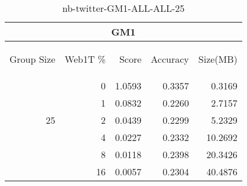 \begin{center}
\begin{table}[htbp]
\begin{tabular}{ | r | r | r | r | r |}
\hline
\multicolumn{5}{|c|}{GM1}\\
\hline
\begin{sideways}Group Size\end{sideways} & \begin{sideways}Web1T \%\end{sideways} & \begin{sideways}Score\end{sideways} & \begin{sideways}Accuracy\end{sideways} & \begin{sideways}Size(MB)\end{sideways}\\
\hline
\multirow{5}{*}{25}
 & 0 & 1.0593 & 0.3357 & 0.3169\\ \cline{2-5}
 & 1 & 0.0832 & 0.2260 & 2.7157\\ \cline{2-5}
 & 2 & 0.0439 & 0.2299 & 5.2329\\ \cline{2-5}
 & 4 & 0.0227 & 0.2332 & 10.2692\\ \cline{2-5}
 & 8 & 0.0118 & 0.2398 & 20.3426\\ \cline{2-5}
 & 16 & 0.0057 & 0.2304 & 40.4876\\ \cline{2-5}
\hline
\end{tabular}
\caption{nb-twitter-GM1-ALL-ALL-25}
\label{table:nb-twitter-GM1-ALL-ALL-25}
\end{table}
\end{center}

